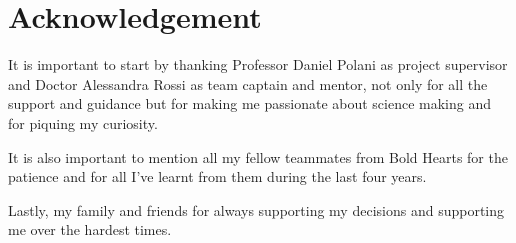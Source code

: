 \section*{Acknowledgement}
It is important to start by thanking Professor Daniel Polani as project supervisor and Doctor Alessandra Rossi as team captain and mentor, not only for all the support and guidance but for making me passionate about science making and for piquing my curiosity.

It is also important to mention all my fellow teammates from Bold Hearts for the patience and for all I've learnt from them during the last four years.

Lastly, my family and friends for always supporting my decisions and supporting me over the hardest times.